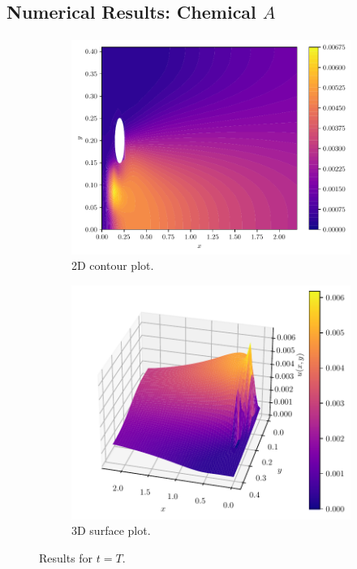 \documentclass{beamer}
\theoremstyle{definition}
\theoremstyle{remark}
\theoremstyle{example}
\newif\ifinsection
\newif\ifinsubsection
\let\oldsubsection\subsection
\renewcommand{\subsection}{
  \global\insubsectiontrue
  \oldsubsection}
\newcommand {\aframe}[1] {
  \begin{frame}
    \ifinsection\frametitle{\secname}\fi
    \ifinsubsection\framesubtitle{\subsecname}\fi
  #1
  \end{frame}
}
\begin{document}
\subsection{Numerical Results: Chemical $A$}
\aframe{
\begin{figure}
  \begin{subfigure}[b]{0.45\textwidth}
    \centering
    \includegraphics[width=\textwidth]{figs/a-chemical-2d.pdf}
    \caption{2D contour plot.}
  \end{subfigure}
  \begin{subfigure}[b]{0.53\textwidth}
    \centering
    \includegraphics[width=\textwidth]{figs/a-chemical-3d.pdf}
    \caption{3D surface plot.}
  \end{subfigure}
  \caption{Results for $t=T$.}
\end{figure}
}
\end{document}
